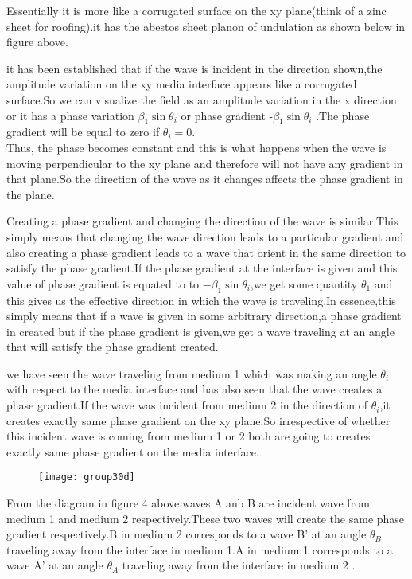 Essentially it is more like a corrugated surface on the xy plane(think of a zinc sheet for roofing).it has the abestos sheet planon of undulation as shown below in figure above.

it has been established that if  the wave is incident in the direction shown,the amplitude variation on the xy media interface appears like a corrugated surface.So we can visualize the field as an amplitude variation in the x direction or it has a phase variation $\beta_1\sin \theta_i$ or phase gradient -$\beta_1\sin\theta_i$ .The phase gradient will be equal to zero if $\theta_i=0$.\\Thus, the phase becomes constant and this is what happens when the wave is moving perpendicular to the xy plane and therefore will not have any gradient in that plane.So the direction of the wave as it changes affects the phase gradient in the plane.

Creating a phase gradient and changing  the direction of the wave is similar.This simply means that changing the wave direction leads to a particular gradient and also creating a phase gradient leads to a wave that orient in the same direction to satisfy the phase gradient.If the phase gradient at the interface is given and this value of  phase gradient is equated to to $-\beta_1 \sin \theta_i$,we get some quantity $\theta_1$ and this gives us the effective direction in which the wave is traveling.In essence,this simply means that  if a wave is given in some arbitrary direction,a phase gradient in created but if the phase gradient is given,we get a wave traveling at an angle that will satisfy the phase gradient created.

we have seen the wave traveling from medium 1  which was making an angle $\theta_i$ with respect to the media interface and has also seen that the wave creates a phase gradient.If the wave was incident from medium 2 in the direction of $\theta_i$,it creates exactly same phase gradient on the xy plane.So irrespective of whether this incident wave is coming from medium 1 or 2 both are going to creates exactly same phase gradient on the media interface.


\begin{figure}
\centering
\texttt{[image: group30d]}
\caption{}
\label{fig:group30d---copy}
\end{figure}

From the diagram in figure 4 above,waves A anb B are incident wave from medium 1 and medium 2 respectively.These two waves will create the same phase gradient respectively.B in medium 2 corresponds to a wave B'  at an angle $\theta_B$ traveling away from the interface in medium 1.A in medium 1 corresponds to a wave A' at an angle $\theta_A$ traveling away from the interface in medium 2 .

